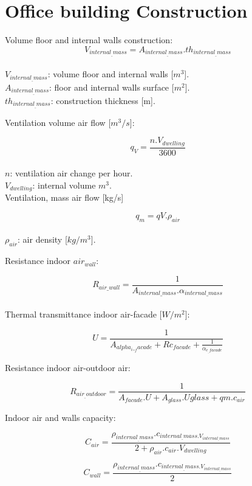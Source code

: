 \section{Office building Construction}
	
	
Volume floor and internal walls construction:
\begin{equation}
	V_{internal_{\_}mass}=A_{internal_{\_}mass}.th_{internal_{\_}mass}
\end{equation}
\\	
$V_{internal_{\_}mass}$: volume floor and internal walls [$m^3$].\\
$A_{internal_{\_}mass}$: floor and internal walls surface [$m^2$].\\
$th_{internal_{\_}mass}$: construction thickness [m].
	
Ventilation volume air flow [$m^3/s$]:
	
\begin{equation}
	q_{V}=\frac{n.V_{dwelling}}{3600}
\end{equation}
\\
$n$: ventilation air change per hour.\\  
$V_{dwelling}$: internal volume $m^3$.\\
	
Ventilation, mass air flow [kg/s]
	
\begin{equation}
	q_{m}=q{V}.\rho_{air}
\end{equation}
\\
$\rho_{air}$: air density [$kg/m^3$].
	
Resistance indoor $air_{wall}$:
	
\begin{equation}
	R_{air{\_}wall}=\frac{1}{A_{internal{\_}mass}.\alpha_{internal{\_}mass}}
\end{equation}
\\
Thermal transmittance indoor air-facade [$W/m^2$]: 
	
\begin{equation}
	U=\frac{1}{A_{alpha_i{\_}_facade} + Rc_{facade} + \frac{1}{\alpha_{e_{\_}facade}}}
\end{equation}
	
Resistance indoor air-outdoor air:
	
\begin{equation}
	R_{air_{\_}outdoor}=\frac{1}{A_{facade}.U + A_{glass}.U{glass}+q{m}.c_{air}}
\end{equation}
	
Indoor air and walls capacity:
	
\begin{equation}
	C_{air}=\frac{\rho_{internal_{\_}mass}.c_{internal_{\_}mass.V_{internal_{\_}mass}}}{2 + \rho_{air}.c_{air}.V_{dwelling}}
\end{equation}
	
\begin{equation}
	C_{wall}=\frac{\rho_{internal_{\_}mass}.c_{internal_{\_}mass.V_{internal_{\_}mass}}}{2}
\end{equation}
	
	